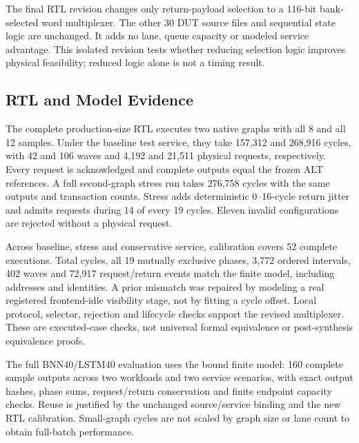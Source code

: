 The final RTL revision changes only return-payload selection to a 116-bit bank-selected word multiplexer. The other 30 DUT source files and sequential state logic are unchanged. It adds no lane, queue capacity or modeled service advantage. This isolated revision tests whether reducing selection logic improves physical feasibility; reduced logic alone is not a timing result.

\subsection{RTL and Model Evidence}
The complete production-size RTL executes two native graphs with all 8 and all 12 samples. Under the baseline test service, they take 157,312 and 268,916 cycles, with 42 and 106 waves and 4,192 and 21,511 physical requests, respectively. Every request is acknowledged and complete outputs equal the frozen ALT references. A full second-graph stress run takes 276,758 cycles with the same outputs and transaction counts. Stress adds deterministic 0--16-cycle return jitter and admits requests during 14 of every 19 cycles. Eleven invalid configurations are rejected without a physical request.

Across baseline, stress and conservative service, calibration covers 52 complete executions. Total cycles, all 19 mutually exclusive phases, 3,772 ordered intervals, 402 waves and 72,917 request/return events match the finite model, including addresses and identities. A prior mismatch was repaired by modeling a real registered frontend-idle visibility stage, not by fitting a cycle offset. Local protocol, selector, rejection and lifecycle checks support the revised multiplexer. These are executed-case checks, not universal formal equivalence or post-synthesis equivalence proofs.

The full BNN40/LSTM40 evaluation uses the bound finite model: 160 complete sample outputs across two workloads and two service scenarios, with exact output hashes, phase sums, request/return conservation and finite endpoint capacity checks. Reuse is justified by the unchanged source/service binding and the new RTL calibration. Small-graph cycles are not scaled by graph size or lane count to obtain full-batch performance.
